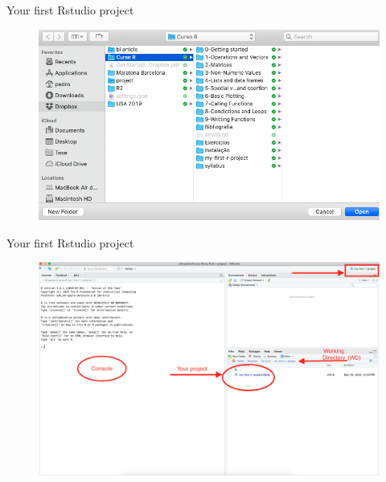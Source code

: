 \documentclass[ignorenonframetext,]{beamer}
\begin{document}
\begin{frame}{Your first Rstudio project}
\protect\hypertarget{your-first-rstudio-project-4}{}

\begin{figure}
\includegraphics[scale=0.33]{figures/new-project-5.png}
\end{figure}

\end{frame}

\begin{frame}{Your first Rstudio project}
\protect\hypertarget{your-first-rstudio-project-5}{}

\begin{figure}
\includegraphics[scale=0.19]{figures/environment.png}
\end{figure}

\end{frame}
\end{document}
